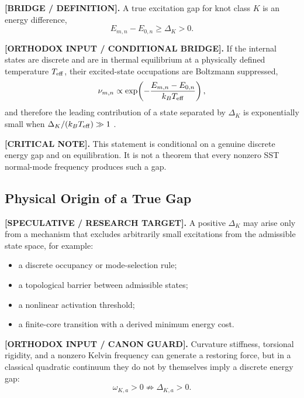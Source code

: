         \textbf{[BRIDGE / DEFINITION].}
        A true excitation gap for knot class $K$ is an energy difference,
        \begin{equation}
            E_{m,n}-E_{0,n}
            \geq
            \Delta_K
            >0 .
            \label{eq:canon_true_excitation_gap}
        \end{equation}

        \textbf{[ORTHODOX INPUT / CONDITIONAL BRIDGE].}
        If the internal states are discrete and are in thermal equilibrium at a
        physically defined temperature $T_{\rm eff}$, their excited-state
        occupations are Boltzmann suppressed,
        \begin{equation}
            \nu_{m,n}
            \propto
            \exp\!\left(-\frac{E_{m,n}-E_{0,n}}{k_B T_{\rm eff}}\right),
            \label{eq:boltzmann_suppression}
        \end{equation}
        and therefore the leading contribution of a state separated by
        $\Delta_K$ is exponentially small when
        $\Delta_K/(k_BT_{\rm eff})\gg1$ \cite{PathriaBeale2011}.

        \textbf{[CRITICAL NOTE].}
        This statement is conditional on a genuine discrete energy gap and on
        equilibration.  It is not a theorem that every nonzero SST normal-mode
        frequency produces such a gap.

    \subsection{Physical Origin of a True Gap}

        \textbf{[SPECULATIVE / RESEARCH TARGET].}
        A positive $\Delta_K$ may arise only from a mechanism that excludes
        arbitrarily small excitations from the admissible state space, for
        example:
        \begin{itemize}
            \item a discrete occupancy or mode-selection rule;
            \item a topological barrier between admissible states;
            \item a nonlinear activation threshold;
            \item a finite-core transition with a derived minimum energy cost.
        \end{itemize}

        \textbf{[ORTHODOX INPUT / CANON GUARD].}
        Curvature stiffness, torsional rigidity, and a nonzero Kelvin frequency
        can generate a restoring force, but in a classical quadratic continuum
        they do not by themselves imply a discrete energy gap:
        \begin{equation}
            \omega_{K,a}>0
            \not\Rightarrow
            \Delta_{K,a}>0 .
            \label{eq:canon_gap_frequency_guard_local}
        \end{equation}

